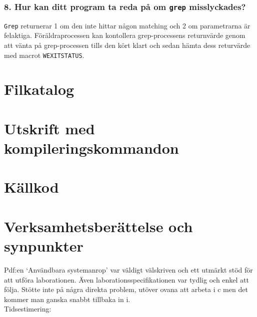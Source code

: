 \documentclass[a4paper]{article}
\begin{document}
\subsubsection*{8. Hur kan ditt program ta reda på om \texttt{grep} misslyckades?}
\texttt{Grep} returnerar 1 om den inte hittar någon matching och 2 om parametrarna är felaktiga. Föräldraprocessen kan kontollera grep-processens returnvärde genom att vänta på grep-processen tills den kört klart och sedan hämta dess returvärde med macrot \texttt{WEXITSTATUS}.

\section*{Filkatalog}

\section*{Utskrift med kompileringskommandon}

\section*{Källkod}


\section*{Verksamhetsberättelse och synpunkter}
Pdf:en ‘Användbara systemanrop’ var väldigt välskriven och ett utmärkt stöd för att utföra laborationen. Även laborationsspecifikationen var tydlig och enkel att följa. Stötte inte på några direkta problem, utöver ovana att arbeta i c men det kommer man ganska snabbt tillbaka in i.
\\
Tidsestimering: 
\end{document}
